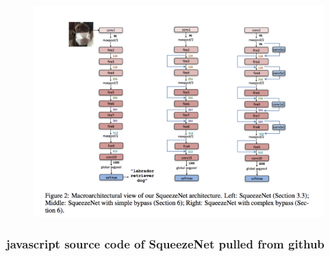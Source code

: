 \documentclass[11pt]{article}
\makeatletter
\def\maxwidth{\ifdim\Gin@nat@width>\linewidth\linewidth
    \else\Gin@nat@width\fi}
\let\Oldincludegraphics\includegraphics
\renewcommand{\includegraphics}[1]{\Oldincludegraphics[width=.8\maxwidth]{#1}}
\makeatother
\begin{document}
\begin{figure}[htbp]
\centering
\includegraphics{squeezenet.png}
\caption{}
\end{figure}

    \subsubsection{javascript source code of SqueezeNet pulled from
github}\label{javascript-source-code-of-squeezenet-pulled-from-github}
\end{document}
